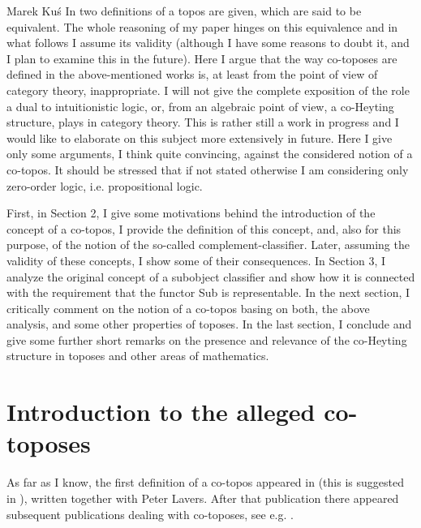 \begin{artengenv}{Marek Ku\'s}
In \parencite[p.161f and p.163]{maclane-moerdijk-1994} two definitions of a topos are given, which are said to be equivalent. The whole reasoning of my paper hinges on this equivalence and in what follows I assume its validity (although I have some reasons to doubt it, and I plan to examine this in the future). Here I argue that the way co-toposes are defined in the above-mentioned works is, at least from the point of view of category theory, inappropriate. I will not give the complete exposition of the role a dual to intuitionistic logic, or, from an algebraic point of view, a co-Heyting structure, plays in category theory. This is rather still a work in progress and I would like to elaborate on this subject more extensively in future. Here I give only some arguments, I think quite convincing, against the considered notion of a co-topos. It should be stressed that if not stated otherwise I am considering only zero-order logic, i.e. propositional logic.

First, in Section 2, I give some motivations behind the introduction of the concept of a co-topos, I provide the definition of this concept, and, also for this purpose, of the notion of the so-called complement-classifier. Later, assuming the validity of these concepts, I show some of their consequences. In Section 3, I analyze the original concept of a subobject classifier and show how it is connected with the requirement that the functor \textsf{Sub} is representable. In the next section, I critically comment on the notion of a co-topos basing on both, the above analysis, and some other properties of toposes. In the last section, I conclude and give some further short remarks on the presence and relevance of the co-Heyting structure in toposes and other areas of mathematics.



\section{Introduction to the alleged co-toposes}

As far as I know, the first definition of a co-topos appeared in \parencite[Chapter 11]{mortensen-1995} (this is suggested in \parencite[p.80]{james-phd-1996}), written together with Peter Lavers. After that publication there appeared subsequent publications dealing with co-toposes, see e.g. \parencite{james-phd-1996, mortensen-2003, estrada-gonzalez-2010, estrada-gonzalez-2015}. 


\end{artengenv}
